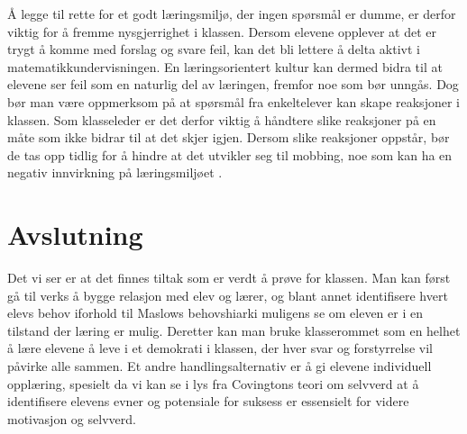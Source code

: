 \documentclass[12pt,a4paper]{article}
\begin{document}
Å legge til rette for et godt læringsmiljø, der ingen spørsmål er dumme, er derfor viktig for å fremme nysgjerrighet i klassen. Dersom elevene opplever at det er trygt å komme med forslag og svare feil, kan det bli lettere å delta aktivt i matematikkundervisningen. En læringsorientert kultur kan dermed bidra til at elevene ser feil som en naturlig del av læringen, fremfor noe som bør unngås. Dog bør man være oppmerksom på at spørsmål fra enkeltelever kan skape reaksjoner i klassen. Som
klasseleder er det derfor viktig å håndtere slike reaksjoner på en måte som ikke bidrar til at det skjer igjen. Dersom slike reaksjoner oppstår, bør de tas opp tidlig for å hindre at det utvikler seg til mobbing, noe som kan ha en negativ innvirkning
på læringsmiljøet \parencite{werler2024}.



\section{Avslutning}

Det vi ser er at det finnes tiltak som er verdt å prøve for klassen. Man kan først gå til verks å bygge relasjon med elev og lærer, og blant annet identifisere hvert elevs behov iforhold til Maslows behovshiarki muligens se om eleven er i en tilstand
der læring er mulig. Deretter kan man bruke klasserommet som en helhet å lære elevene å leve i et demokrati i klassen, der hver svar og forstyrrelse vil påvirke alle sammen. Et andre handlingsalternativ er å gi elevene
individuell opplæring, spesielt da vi kan se i lys fra Covingtons teori om selvverd at å identifisere elevens evner og potensiale for suksess er essensielt for videre motivasjon og selvverd.  


\printbibliography
\end{document}
